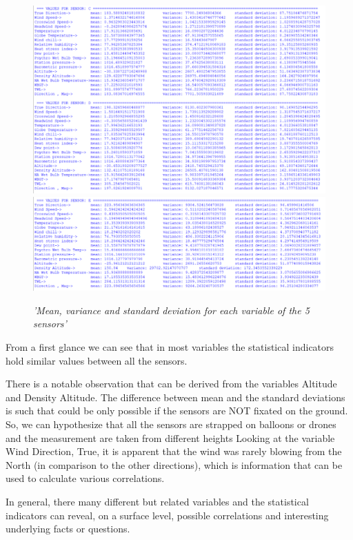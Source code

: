 \documentclass[a4paper,12pt]{article} %
\begin{document}
\begin{figure}[H]
\centering
\includegraphics[width=\textwidth]{Graphs/Statistcal Indicators CD.PNG}
\includegraphics[width=\textwidth]{Graphs/Statistcal Indicators E.PNG}
\caption{\it'Mean, variance and standard deviation for each variable of the 5 sensors'}
\end{figure}




From a first glance we can see that in most variables the statistical indicators hold similar values between all the sensors.




There is a notable observation that can be derived from the variables Altitude and Density Altitude. 
The difference between mean and the standard deviations is such that could be only possible if the sensors are NOT fixated on the ground. 
So, we can hypothesize that all the sensors are strapped on balloons or drones and the measurement are taken from different heights
Looking at the variable Wind Direction, True, it is apparent that the wind was rarely blowing from the North (in comparison to the other directions),
which is information that can be used to calculate various correlations.




In general, there many different but related variables and the statistical indicators can reveal, 
on a surface level, possible correlations and interesting underlying facts or questions.
\end{document}
